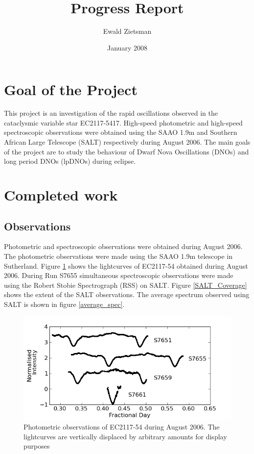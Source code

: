 \documentclass[a4paper,10pt]{article}
\title{Progress Report}
\author{Ewald Zietsman}
\date{January 2008}
\begin{document}
\maketitle

\section{Goal of the Project}

This project is an investigation of the rapid oscillations observed in the cataclysmic variable star EC2117-5417. High-speed photometric and high-speed spectroscopic observations were obtained using the SAAO 1.9m and Southern African Large Telescope (SALT) respectively during August 2006. The main goals of the project are to study the behaviour of Dwarf Nova Oscillations (DNOs) and long period DNOs (lpDNOs) during eclipse.


\section{Completed work}

\subsection{Observations}

Photometric and spectroscopic observations were obtained during August 2006. The photometric observations were made using the SAAO 1.9m telescope in Sutherland. Figure \ref{photometry} shows the lightcurves of EC2117-54 obtained during August 2006. During Run S7655 simultaneous spectroscopic observations were made using the Robert Stobie Spectrograph (RSS) on SALT. Figure \ref{SALT_Coverage} shows the extent of the SALT observations. The average spectrum observed using SALT is shown in figure \ref{average_spec}. 

\begin{figure}
 \centering
 \includegraphics[width=0.8\columnwidth,bb=0 0 600 400]{../images/lightcurves.png}
 \caption{Photometric observations of EC2117-54 during August 2006. The lightcurves are vertically displaced by arbitrary amounts for display purposes}
 \label{photometry}
\end{figure}
\end{document}
